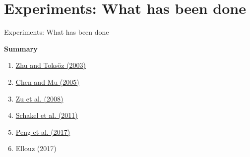 \documentclass[utf8]{beamer} \usetheme{lfcr} %
\begin{document}
\section{Experiments: What has been done}
\begin{frame}{Experiments: What has been done}
  \begin{center}
    \textbf{Summary}
   
    \begin{enumerate}
      \item \href{https://library.seg.org/doi/10.1190/1.1620625}{Zhu and Toksöz (2003)}
      \item \href{https://academic.oup.com/jge/article/2/3/222/5127595}{Chen and Mu (2005)}
      \item \href{https://library.seg.org/doi/10.1190/1.2952570}{Zu et al. (2008)}
      \item \href{https://library.seg.org/doi/10.1190/1.3592984}{Schakel et al. (2011)}
      \item \href{https://academic.oup.com/gji/article-abstract/210/3/1703/3867307?redirectedFrom=fulltext}{Peng et al. (2017)}
      \item Ellouz (2017)
    \end{enumerate}
  \end{center}
\end{frame}
%
\end{document}
